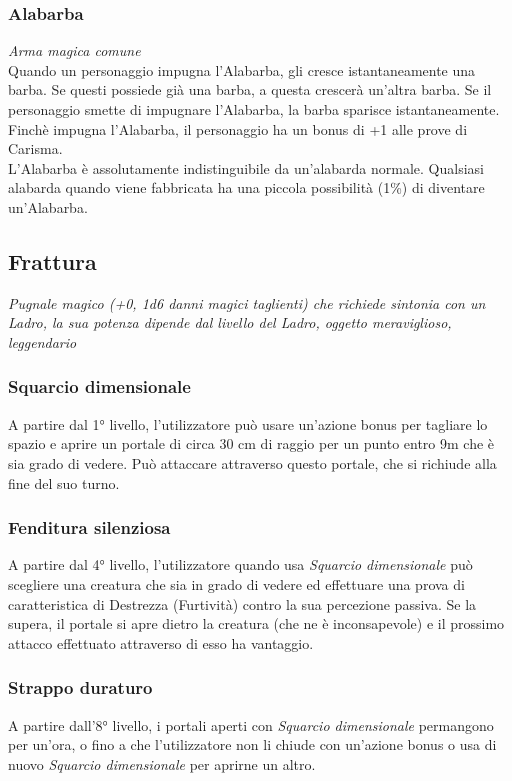 \subsubsection{Alabarba}
\textit{Arma magica comune}\\
Quando un personaggio impugna l'Alabarba, gli cresce istantaneamente una barba. Se questi possiede già una barba, a questa crescerà un'altra barba. Se il personaggio smette di impugnare l'Alabarba, la barba sparisce istantaneamente. Finchè impugna l'Alabarba, il personaggio ha un bonus di +1 alle prove di Carisma.\\
L'Alabarba è assolutamente indistinguibile da un'alabarda normale. Qualsiasi alabarda quando viene fabbricata ha una piccola possibilità (1\%) di diventare un'Alabarba.

\subsection{Frattura}
\textit{Pugnale magico (+0, 1d6 danni magici taglienti) che richiede sintonia con un Ladro, la sua potenza dipende dal livello del Ladro, oggetto meraviglioso, leggendario}

\subsubsection{Squarcio dimensionale}
A partire dal 1° livello, l'utilizzatore può usare un'azione bonus per tagliare lo spazio e aprire un portale di circa 30 cm di raggio per un punto entro 9m che è sia grado di vedere. Può attaccare attraverso questo portale, che si richiude alla fine del suo turno.

\subsubsection{Fenditura silenziosa}
A partire dal 4° livello, l'utilizzatore quando usa \textit{Squarcio dimensionale} può scegliere una creatura che sia in grado di vedere ed effettuare una prova di caratteristica di Destrezza (Furtività) contro la sua percezione passiva. Se la supera, il portale si apre dietro la creatura (che ne è inconsapevole) e il prossimo attacco effettuato attraverso di esso ha vantaggio.

\subsubsection{Strappo duraturo}
A partire dall'8° livello, i portali aperti con \textit{Squarcio dimensionale} permangono per un'ora, o fino a che l'utilizzatore non li chiude con un'azione bonus o usa di nuovo \textit{Squarcio dimensionale} per aprirne un altro.

